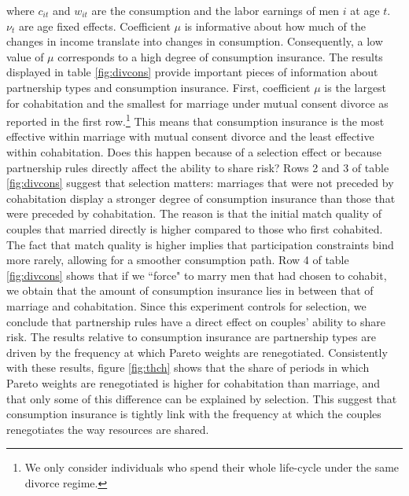 \documentclass[12pt]{article}
\numberwithin{table}{section}
\begin{document}
where $c_{it}$ and $w_{it}$ are the consumption and the labor earnings of men $i$ at age $t$. $\nu_{t}$ are age fixed effects. Coefficient $\mu$ is informative about how much of the changes in income translate into changes in consumption. Consequently, a low value of $\mu$ corresponds to a high degree of consumption insurance. The results displayed in table \ref{fig:divcons} provide important pieces of information about partnership types and consumption insurance. First, coefficient $\mu$ is the largest for cohabitation and the smallest for marriage under mutual consent divorce as reported in the first row.\footnote{We only consider individuals who spend their whole life-cycle under the same divorce regime.} This means that consumption insurance is the most effective within marriage with mutual consent divorce and the least effective within cohabitation. Does this happen because of a selection effect or because partnership rules directly affect the ability to share risk? Rows 2 and 3 of table \ref{fig:divcons} suggest that selection matters: marriages that were not preceded by cohabitation display a stronger degree of consumption insurance than those that were preceded by cohabitation. The reason is that the initial match quality of couples that married directly is higher compared to those who first cohabited. The fact that match quality is higher  implies that participation constraints bind more rarely, allowing for a smoother consumption path. Row 4 of table \ref{fig:divcons} shows that if we ``force" to marry men that had chosen to cohabit, we obtain that the amount of consumption insurance lies in between that of marriage and cohabitation. Since this experiment controls for selection, we conclude that partnership rules have a direct effect on couples' ability to share risk. The results relative to consumption insurance are partnership types are driven by the frequency at which Pareto weights are renegotiated. Consistently with these results, figure \ref{fig:thch} shows that the share of periods in which Pareto weights are renegotiated is higher for cohabitation than marriage, and that only some of this difference can be explained by selection. This suggest that consumption insurance is tightly link with the frequency at which the couples renegotiates the way resources are shared.\\
\end{document}
